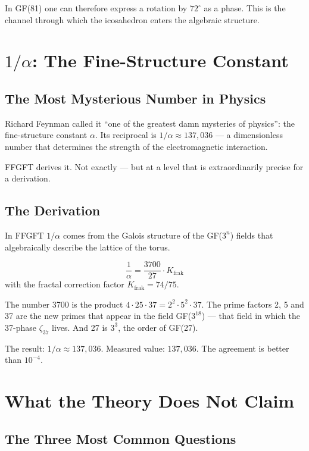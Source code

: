 \documentclass[12pt,oneside]{book}
\begin{document}
In GF(81) one can therefore express a rotation by $72^\circ$ as a phase. This is the channel through which the icosa\-hedron enters the algebraic structure.

\chapter{$1/\alpha$: The Fine-Structure Constant}

\section{The Most Mysterious Number in Physics}

Richard Feynman called it ``one of the greatest damn mysteries of physics'': the fine-structure constant $\alpha$. Its reciprocal is $1/\alpha \approx 137{,}036$ --- a dimensionless number that determines the strength of the electromagnetic interaction.

FFGFT derives it. Not exactly --- but at a level that is extraordinarily precise for a derivation.

\section{The Derivation}

In FFGFT $1/\alpha$ comes from the Galois structure of the GF($3^n$) fields that algebraically describe the lattice of the torus.

\begin{merkbox}
\[
\frac{1}{\alpha} = \frac{3700}{27} \cdot K_{\text{frak}}
\]
with the fractal cor\-rection factor $K_{\text{frak}} = 74/75$.
\end{merkbox}

The number 3700 is the product $4 \cdot 25 \cdot 37 = 2^2 \cdot 5^2 \cdot 37$. The prime factors 2, 5 and 37 are the new primes that appear in the field GF($3^{18}$) --- that field in which the 37-phase $\zeta_{37}$ lives. And 27 is $3^3$, the order of GF(27).

The result: $1/\alpha \approx 137{,}036$. Measured value: $137{,}036$. The agreement is better than $10^{-4}$.

\chapter{What the Theory Does Not Claim}

\section{The Three Most Common Questions}
\end{document}
